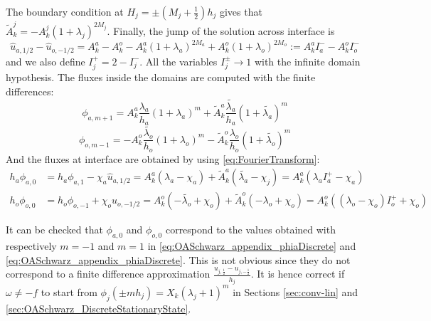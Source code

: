 The boundary condition at $H_j = \pm(M_j + \frac{1}{2}) h_j$ gives that
$\widetilde{A}_k^j = - A_k^j \left(1+\lambda_j\right)^{2 M_j}$.
Finally, the jump of the solution across interface is
\begin{equation*}
\widehat{u}_{a, 1/2} - 
\widehat{u}_{o, -1/2} = A_k^a - A_k^o
- A_k^a\left(1+\lambda_a\right)^{2M_a}
+ A_k^o\left(1+\lambda_o\right)^{2M_o}
	:= A_k^a I_a^{-} - A_k^o I_o^{-}
\end{equation*}
and we also define $I_j^{+} = 2-I_j^{-}$. All the variables
$I_j^{\pm}\rightarrow 1$ with the infinite domain hypothesis.
The fluxes inside the domains are computed
with the finite differences:
\begin{equation}
	\label{eq:OASchwarz_appendix_phiaDiscrete}
\phi_{a,m+1} = A_k^a \frac{\lambda_a}{h_a}
	(1+\lambda_a)^m + \widetilde{A}_k^a \frac{\widetilde{\lambda_a}}{h_a}
	(1+\widetilde{\lambda_a})^m
\end{equation}
\begin{equation}
	\label{eq:OASchwarz_appendix_phioDiscrete}
\phi_{o,m-1} = -A_k^o \frac{\widetilde{\lambda_o}}{h_o}
	(1+\lambda_o)^m - \widetilde{A}_k^o \frac{{\lambda_o}}{h_o}
	(1+\widetilde{\lambda_o})^m
\end{equation}
And the fluxes at interface are obtained 
by using \eqref{eq:FourierTransform}:
\begin{equation*}
\begin{aligned}
h_a\phi_{a,0}&= h_a\phi_{a,1} - \chi_a \widehat{u}_{a, 1/2}
= A_k^a \left(\lambda_a - \chi_a\right) +
	\widetilde{A}_k^a\left(\widetilde{\lambda_a} - \chi_j\right)
	= A_k^a ({\lambda_a} I_a^{+} - \chi_a)
\\
h_o\phi_{o,0}&= h_o\phi_{o,-1} + \chi_o \widehat{u}_{o, -1/2}
	= A_k^o \left(-\widetilde{\lambda_o} + \chi_o\right) +
	\widetilde{A}_k^o\left(-{\lambda_o} + \chi_o\right)
	=A_k^o(({\lambda_o}-\chi_o)I_o^{+} + \chi_o)
\end{aligned}
\end{equation*}
\begin{remark}
It can be checked that $\phi_{a,0}$ and $\phi_{o,0}$
correspond to the values obtained with respectively
$m=-1$ and $m=1$ in
\eqref{eq:OASchwarz_appendix_phiaDiscrete} and
\eqref{eq:OASchwarz_appendix_phiaDiscrete}. This
is not obvious since they do not correspond to a finite
difference approximation $\frac{u_{j, \frac{1}{2}} -
u_{j, -\frac{1}{2}}}{h_j}$.
It is hence correct if $\omega \neq -f$ to start from
$\phi_j(\pm m h_j)= X_k(\lambda_j+1)^m$ in Sections
	\ref{sec:conv-lin} and \ref{sec:OASchwarz_DiscreteStationaryState}.
\end{remark}
